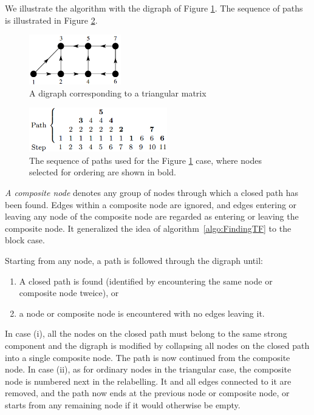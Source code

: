 \begin{exm}
  We illustrate the algorithm with the digraph of Figure \ref{fig:DigraphOfSargent}. The
  sequence of paths is illustrated in Figure \ref{fig:AlgorithmOfSargent}.
  \begin{figure}[H]
    \centering
    \includegraphics[width=4cm]{png/DigraphToTri.png}
    \caption{A digraph corresponding to a triangular matrix}
    \label{fig:DigraphOfSargent}
  \end{figure}
   \begin{figure}[H]
     \centering
    \includegraphics[width=6cm]{png/SequenceOfAlgoSW.png}
    \caption{The sequence of paths used for the Figure
      \ref{fig:DigraphOfSargent} case, where nodes selected for
      ordering are shown in bold.}
     \label{fig:AlgorithmOfSargent}
  \end{figure}
\end{exm}

\begin{defn}
  \emph{A composite node} denotes any group of nodes through which a
  closed path has been found. Edges within a composite node are ignored,
and edges entering or leaving any node of the composite node are regarded as
entering or leaving the composite node. It generalized the idea of
  algorithm~\ref{algo:FindingTF} to the block case.
\end{defn}

\begin{alg}
  
  Starting from any node, a path is followed through the digraph
  until:
  \begin{enumerate}
  \item A closed path is found (identified by encountering the same
    node or composite node tweice), or
  \item a node or composite node is encountered with no edges leaving it.
  \end{enumerate}
  In case (i), all the nodes on the closed path must belong to the same strong
component and the digraph is modified by collapsing all nodes on the closed
path into a single composite node.  The path is now continued from the
composite node.
In case (ii), as for ordinary nodes in the triangular case, the composite node
is numbered next in the relabelling. It and all edges connected to it are removed,
and the path now ends at the previous node or composite node, or starts from
any remaining node if it would otherwise be empty.
\end{alg}

